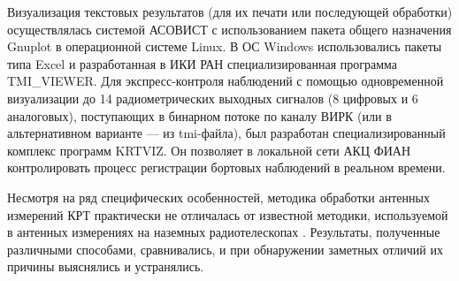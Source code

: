Визуализация текстовых результатов (для их печати или последующей обработки) осуществлялась системой
АСОВИСТ с использованием пакета общего назначения Gnuplot в операционной системе Linux. В ОС Windows
использовались пакеты типа Excel и разработанная в ИКИ РАН специализированная программа TMI\_VIEWER.
Для экспресс-контроля наблюдений с помощью одновременной визуализации до 14 радиометрических
выходных сигналов (8 цифровых и 6 аналоговых), поступающих в бинарном потоке по каналу ВИРК (или  в
альтернативном варианте  --- из tmi-файла), был разработан специализированный комплекс программ
KRTVIZ. Он позволяет в локальной сети АКЦ ФИАН контролировать процесс регистрации бортовых
наблюдений в реальном времени.

Несмотря на ряд специфических особенностей, методика обработки антенных измерений КРТ практически не
отличалась от известной методики, используемой в антенных измерениях на наземных радиотелескопах
\cite{Kovalev_1999}. Результаты, полученные различными способами, сравнивались, и при обнаружении
заметных отличий их причины выяснялись и устранялись.


